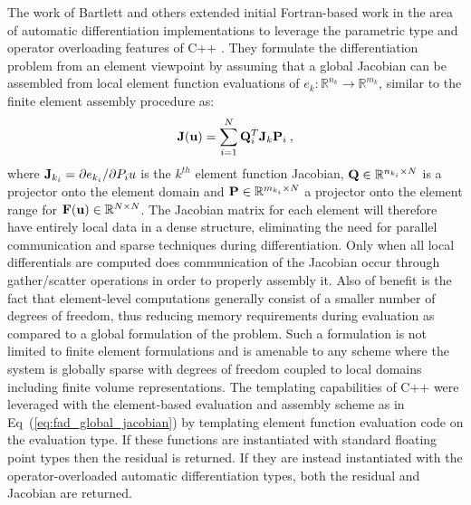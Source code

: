 The work of Bartlett and others \citep{bartlett_automatic_2006}
extended initial Fortran-based work in the area of automatic
differentiation implementations to leverage the parametric type and
operator overloading features of C++ \citep{stroustrup_c++_1997}. They
formulate the differentiation problem from an element viewpoint by
assuming that a global Jacobian can be assembled from local element
function evaluations of $e_k : \mathbb{R}^{n_k} \rightarrow
\mathbb{R}^{m_k}$, similar to the finite element assembly procedure
as:
\begin{equation}
  \mathbf{J}(\mathbf{u}) = \sum_{i=1}^N \mathbf{Q}^T_i \mathbf{J}_k \mathbf{P}_i\:,
  \label{eq:fad_global_jacobian}
\end{equation}
where $\mathbf{J}_{k_i} = \partial e_{k_i} / \partial P_i u$ is the
$k^{th}$ element function Jacobian, $\mathbf{Q} \in \mathbb{R}^{n_{k_i}
  \times N}$ is a projector onto the element domain and $\mathbf{P} \in
\mathbb{R}^{m_{k_i} \times N}$ a projector onto the element range for
$\mathbf{F}(\mathbf{u}) \in \mathbb{R}^{N \times N}$. The Jacobian matrix for
each element will therefore have entirely local data in a dense
structure, eliminating the need for parallel communication and sparse
techniques during differentiation. Only when all local differentials
are computed does communication of the Jacobian occur through
gather/scatter operations in order to properly assembly it. Also of
benefit is the fact that element-level computations generally consist
of a smaller number of degrees of freedom, thus reducing memory
requirements during evaluation as compared to a global formulation of
the problem. Such a formulation is not limited to finite element
formulations and is amenable to any scheme where the system is
globally sparse with degrees of freedom coupled to local domains
including finite volume representations. The templating capabilities
of C++ were leveraged with the element-based evaluation and assembly
scheme as in Eq~(\ref{eq:fad_global_jacobian}) by templating element
function evaluation code on the evaluation type. If these functions
are instantiated with standard floating point types then the residual
is returned. If they are instead instantiated with the
operator-overloaded automatic differentiation types, both the residual
and Jacobian are returned.

